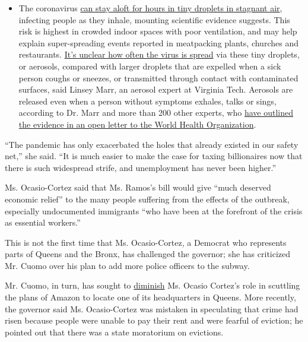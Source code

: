\begin{itemize}
  \begin{itemize}
  \tightlist
  \item
    The coronavirus
    \href{https://www.nytimes.com/2020/07/04/health/239-experts-with-one-big-claim-the-coronavirus-is-airborne.html?action=click\&pgtype=Article\&state=default\&region=MAIN_CONTENT_3\&context=storylines_faq}{can
    stay aloft for hours in tiny droplets in stagnant air}, infecting
    people as they inhale, mounting scientific evidence suggests. This
    risk is highest in crowded indoor spaces with poor ventilation, and
    may help explain super-spreading events reported in meatpacking
    plants, churches and restaurants.
    \href{https://www.nytimes.com/2020/07/06/health/coronavirus-airborne-aerosols.html?action=click\&pgtype=Article\&state=default\&region=MAIN_CONTENT_3\&context=storylines_faq}{It's
    unclear how often the virus is spread} via these tiny droplets, or
    aerosols, compared with larger droplets that are expelled when a
    sick person coughs or sneezes, or transmitted through contact with
    contaminated surfaces, said Linsey Marr, an aerosol expert at
    Virginia Tech. Aerosols are released even when a person without
    symptoms exhales, talks or sings, according to Dr. Marr and more
    than 200 other experts, who
    \href{https://academic.oup.com/cid/article/doi/10.1093/cid/ciaa939/5867798}{have
    outlined the evidence in an open letter to the World Health
    Organization}.
  \end{itemize}
\end{itemize}

``The pandemic has only exacerbated the holes that already existed in
our safety net,'' she said. ``It is much easier to make the case for
taxing billionaires now that there is such widespread strife, and
unemployment has never been higher.''

Ms. Ocasio-Cortez said that Ms. Ramos's bill would give ``much deserved
economic relief'' to the many people suffering from the effects of the
outbreak, especially undocumented immigrants ``who have been at the
forefront of the crisis as essential workers.''

This is not the first time that Ms. Ocasio-Cortez, a Democrat who
represents parts of Queens and the Bronx, has challenged the governor;
she has criticized Mr. Cuomo over his plan to add more police officers
to the subway.

Mr. Cuomo, in turn, has sought to
\href{https://slack-redir.net/link?url=https\%3A\%2F\%2Fnypost.com\%2F2019\%2F11\%2F26\%2Fcuomo-aoc-had-nothing-to-do-with-chasing-out-amazon\%2F}{diminish}
Ms. Ocasio Cortez's role in scuttling the plans of Amazon to locate one
of its headquarters in Queens. More recently, the governor said Ms.
Ocasio-Cortez was mistaken in speculating that crime had risen because
people were unable to pay their rent and were fearful of eviction; he
pointed out that there was a state moratorium on evictions.

